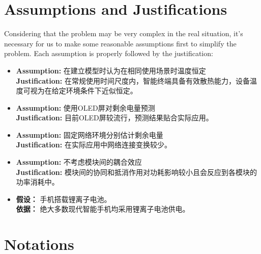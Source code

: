\documentclass{mcmthesis}  %
\begin{document}
	\section{Assumptions and Justifications}  %
	Considering that the problem may be very complex in the real situation, it’s necessary for us to make some reasonable assumptions first to simplify the problem. Each assumption is properly followed by the justification: 
	\begin{itemize}
		\item \textbf{Assumption:} 在建立模型时认为在相同使用场景时温度恒定 \\
		\textbf{Justification:} 在常规使用时间尺度内，智能终端具备有效散热能力，设备温度可视为在给定环境条件下近似恒定。
		
		\item \textbf{Assumption:} 使用OLED屏对剩余电量预测 \\
		\textbf{Justification:} 目前OLED屏较流行，预测结果贴合实际应用。
		
		\item \textbf{Assumption:} 固定网络环境分别估计剩余电量 \\
		\textbf{Justification:} 在实际应用中网络连接变换较少。
		
		\item \textbf{Assumption:} 不考虑模块间的耦合效应 \\
		\textbf{Justification:} 模块间的协同和抵消作用对功耗影响较小且会反应到各模块的功率消耗中。
		
		\item \textbf {假设：} 手机搭载锂离子电池。\\
		\textbf {依据：} 绝大多数现代智能手机均采用锂离子电池供电。
	\end{itemize}
	
	
	\section{Notations}  %
	
\end{document}
